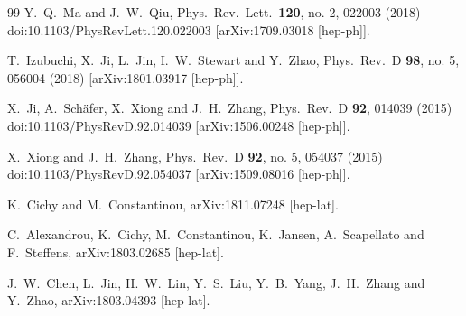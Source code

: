 \begin{thebibliography}{99}
  Y.~Q.~Ma and J.~W.~Qiu,
  Phys.\ Rev.\ Lett.\  {\bf 120}, no. 2, 022003 (2018)
  doi:10.1103/PhysRevLett.120.022003
  [arXiv:1709.03018 [hep-ph]].


  T.~Izubuchi, X.~Ji, L.~Jin, I.~W.~Stewart and Y.~Zhao,
  Phys.\ Rev.\ D {\bf 98}, no. 5, 056004 (2018)
  [arXiv:1801.03917 [hep-ph]].


  X.~Ji, A.~Schäfer, X.~Xiong and J.~H.~Zhang,
  Phys.\ Rev.\ D {\bf 92}, 014039 (2015)
  doi:10.1103/PhysRevD.92.014039
  [arXiv:1506.00248 [hep-ph]].


  X.~Xiong and J.~H.~Zhang,
  Phys.\ Rev.\ D {\bf 92}, no. 5, 054037 (2015)
  doi:10.1103/PhysRevD.92.054037
  [arXiv:1509.08016 [hep-ph]].

  K.~Cichy and M.~Constantinou,
  arXiv:1811.07248 [hep-lat].


  C.~Alexandrou, K.~Cichy, M.~Constantinou, K.~Jansen, A.~Scapellato and F.~Steffens,
  arXiv:1803.02685 [hep-lat].


  J.~W.~Chen, L.~Jin, H.~W.~Lin, Y.~S.~Liu, Y.~B.~Yang, J.~H.~Zhang and Y.~Zhao,
  arXiv:1803.04393 [hep-lat].



\end{thebibliography}
